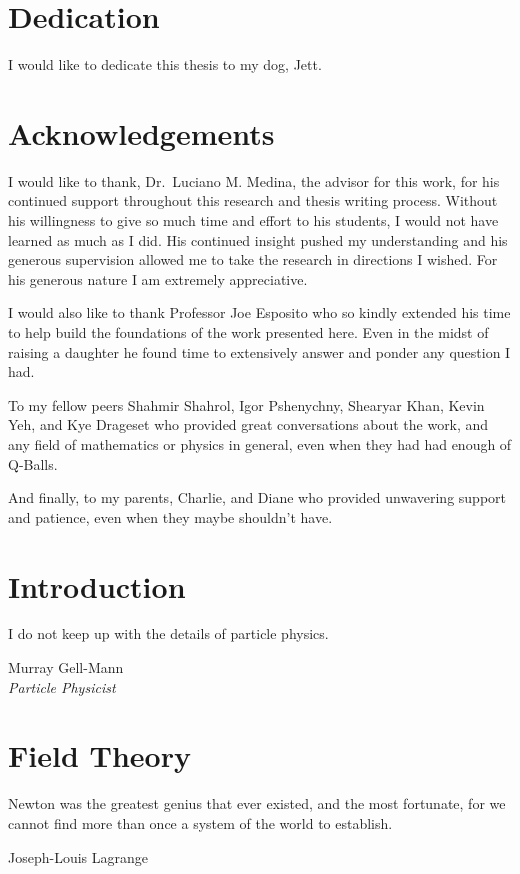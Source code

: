 \documentclass[12pt]{report}
\theoremstyle{definition}
\begin{document}
\thispagestyle{empty}
 
\listoffigures
\begingroup
\let\clearpage\relax
\listoftables
\endgroup

\chapter*{Dedication}
I would like to dedicate this thesis to my dog, Jett.

\chapter*{Acknowledgements}
I would like to thank, Dr.\ Luciano M. Medina, the advisor for this work, for
his continued support throughout this research and thesis writing process.
Without his willingness to give so much time and effort to his students, I
would not have learned as much as I did. His continued insight pushed my
understanding and his generous supervision allowed me to take the research in
directions I wished. For his generous nature I am extremely appreciative.

I would also like to thank Professor Joe Esposito who so kindly extended his
time to help build the foundations of the work presented here. Even in the midst
of raising a daughter he found time to extensively answer and ponder any
question I had.

To my fellow peers Shahmir Shahrol, Igor Pshenychny, Shearyar Khan, Kevin Yeh,
and Kye Drageset who provided great conversations about the work, and any field
of mathematics or physics in general, even when they had had enough of Q-Balls.

And finally, to my parents, Charlie, and Diane who provided unwavering support
and patience, even when they maybe shouldn't have.


\tableofcontents

\chapter{Introduction}\label{chap:intro}
\epigraph{I do not keep up with the details of particle physics.}{Murray Gell-Mann\\\textit{Particle Physicist}}


\chapter{Field Theory}\label{chap:fields}
\epigraph{Newton was the greatest genius that ever existed, and the most
fortunate, for we cannot find more than once a system of the world to
establish.}{Joseph-Louis Lagrange}

\end{document}
